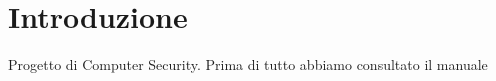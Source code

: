\section{Introduzione}
Progetto di Computer Security. Prima di tutto abbiamo consultato il manuale \cite{inp:tamarin-generation}